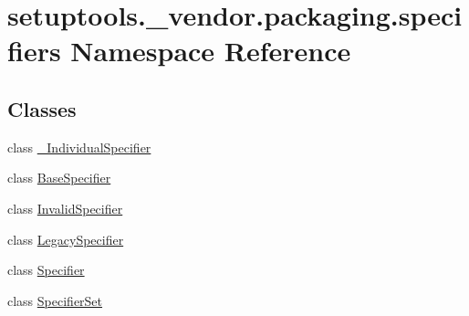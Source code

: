 \hypertarget{namespacesetuptools_1_1__vendor_1_1packaging_1_1specifiers}{}\section{setuptools.\+\_\+vendor.\+packaging.\+specifiers Namespace Reference}
\label{namespacesetuptools_1_1__vendor_1_1packaging_1_1specifiers}
\subsection*{Classes}
\begin{DoxyCompactItemize}
\item 
class \hyperlink{classsetuptools_1_1__vendor_1_1packaging_1_1specifiers_1_1__IndividualSpecifier}{\+\_\+\+Individual\+Specifier}
\item 
class \hyperlink{classsetuptools_1_1__vendor_1_1packaging_1_1specifiers_1_1BaseSpecifier}{Base\+Specifier}
\item 
class \hyperlink{classsetuptools_1_1__vendor_1_1packaging_1_1specifiers_1_1InvalidSpecifier}{Invalid\+Specifier}
\item 
class \hyperlink{classsetuptools_1_1__vendor_1_1packaging_1_1specifiers_1_1LegacySpecifier}{Legacy\+Specifier}
\item 
class \hyperlink{classsetuptools_1_1__vendor_1_1packaging_1_1specifiers_1_1Specifier}{Specifier}
\item 
class \hyperlink{classsetuptools_1_1__vendor_1_1packaging_1_1specifiers_1_1SpecifierSet}{Specifier\+Set}
\end{DoxyCompactItemize}
